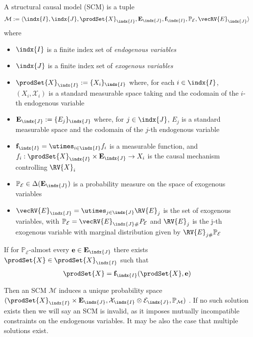 \begin{definition}\label{def:SCM}
    A structural causal model (SCM) is a tuple 
    \begin{align}
        \mathcal{M}:=\langle \indx{I},\indx{J},\prodSet{X}_{\indx{I}},\mathbf{E}_{\indx{J}},\mathbf{f}_{\indx{I}},\mathbb{P}_{\mathcal{E}},{\vecRV{E}}_{\indx{J}}\rangle
    \end{align}
    where 
    \begin{itemize}
        \item $\indx{I}$ is a finite index set of \emph{endogenous variables}
        \item $\indx{J}$ is a finite index set of \emph{exogenous variables}
        \item $\prodSet{X}_{\indx{I}}:=\{X_i\}_{\indx{I}}$ where, for each $i\in \indx{I}$, $(X_i,\mathcal{X}_i)$ is a standard measurable space taking and the codomain of the $i$-th endogenous variable
        \item $\mathbf{E}_{\indx{J}}:=\{E_j\}_{\indx{J}}$ where, for $j\in \indx{J}$, $E_j$ is a standard measurable space and the codomain of the $j$-th endogenous variable
        \item $\mathbf{f}_{\indx{I}}=\utimes_{i\in\indx{I}} f_i$ is a measurable function, and $f_i:\prodSet{X}_{\indx{I}}\times\mathbf{E}_{\indx{J}}\to X_i$ is the causal mechanism controlling $\RV{X}_i$
        \item $\mathbb{P}_{\mathcal{E}}\in \Delta(\mathbf{E}_{\indx{J}})$ is a probability measure on the space of exogenous variables
        \item $\vecRV{E}_{\indx{J}}=\utimes_{j\in\indx{J}} \RV{E}_j$ is the set of exogenous variables, with $\mathbb{P}_{\mathcal{E}}={\vecRV{E}}_{\indx{J}\#}P_{\mathcal{E}}$ and $\RV{E}_j$ is the j-th exogenous variable with marginal distribution given by $\RV{E}_{j\#}\mathbb{P}_{\mathcal{E}}$
    \end{itemize}
\end{definition}

If for $\mathbb{P}_{\mathcal{E}}$-almost every $\mathbf{e}\in\mathbf{E}_{\indx{J}}$ there exists $\prodSet{X}\in\prodSet{X}_{\indx{I}}$ such that
\begin{align}
    \prodSet{X} = \mathbf{f}_{\indx{I}}(\prodSet{X},\mathbf{e})
\end{align}

Then an SCM $\mathcal{M}$ induces a unique probability space $(\prodSet{X}_{\indx{I}}\times\mathbf{E}_{\indx{J}},\mathcal{X}_{\indx{I}}\otimes\mathcal{E}_{\indx{J}},\mathbb{P}_{\mathcal{M}})$ \citep{bongers_theoretical_2016}. If no such solution exists then we will say an SCM is invalid, as it imposes mutually incompatible constraints on the endogenous variables. It may be also the case that multiple solutions exist.

